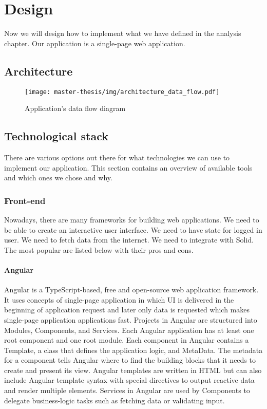 \chapter{Design}
Now we will design how to implement what we have defined in the analysis chapter.
Our application is a single-page web application.

\section{Architecture}
\begin{figure}[h]
  \centering
  \texttt{[image: master-thesis/img/architecture\_data\_flow.pdf]}
  \caption{Application's data flow diagram}
\end{figure}

\section{Technological stack}
There are various options out there for what technologies we can use to implement our application.
This section contains an overview of available tools and which ones we chose and why.

\subsection{Front-end}
Nowadays, there are many frameworks for building web applications.
We need to be able to create an interactive user interface.
We need to have state for logged in user.
We need to fetch data from the internet.
We need to integrate with Solid.
The most popular are listed below with their pros and cons.

\subsubsection*{Angular}
Angular is a TypeScript-based, free and open-source web application framework.
It uses concepts of single-page application in which UI is delivered in the beginning of application request and later only data is requested which makes single-page application applications fast.
Projects in Angular are structured into Modules, Components, and Services. 
Each Angular application has at least one root component and one root module.
Each component in Angular contains a Template, a class that defines the application logic, and MetaData. 
The metadata for a component tells Angular where to find the building blocks that it needs to create and present its view.
Angular templates are written in HTML but can also include Angular template syntax with special directives to output reactive data and render multiple elements.
Services in Angular are used by Components to delegate business-logic tasks such as fetching data or validating input.

